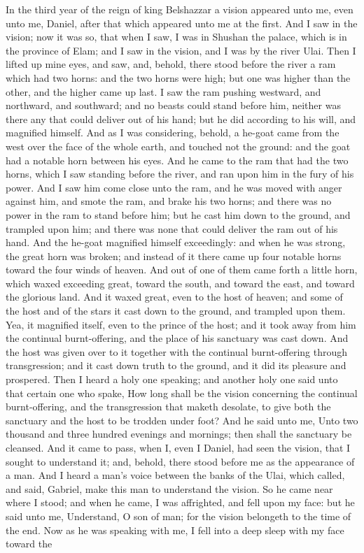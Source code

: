 In the third year of the reign of king Belshazzar a vision appeared unto me, even unto me, Daniel, after that which appeared unto me at the first. And I saw in the vision; now it was so, that when I saw, I was in Shushan the palace, which is in the province of Elam; and I saw in the vision, and I was by the river Ulai. Then I lifted up mine eyes, and saw, and, behold, there stood before the river a ram which had two horns: and the two horns were high; but one was higher than the other, and the higher came up last. I saw the ram pushing westward, and northward, and southward; and no beasts could stand before him, neither was there any that could deliver out of his hand; but he did according to his will, and magnified himself.  And as I was considering, behold, a he-goat came from the west over the face of the whole earth, and touched not the ground: and the goat had a notable horn between his eyes. And he came to the ram that had the two horns, which I saw standing before the river, and ran upon him in the fury of his power. And I saw him come close unto the ram, and he was moved with anger against him, and smote the ram, and brake his two horns; and there was no power in the ram to stand before him; but he cast him down to the ground, and trampled upon him; and there was none that could deliver the ram out of his hand. And the he-goat magnified himself exceedingly: and when he was strong, the great horn was broken; and instead of it there came up four notable horns toward the four winds of heaven.  And out of one of them came forth a little horn, which waxed exceeding great, toward the south, and toward the east, and toward the glorious land. And it waxed great, even to the host of heaven; and some of the host and of the stars it cast down to the ground, and trampled upon them. Yea, it magnified itself, even to the prince of the host; and it took away from him the continual burnt-offering, and the place of his sanctuary was cast down. And the host was given over to it together with the continual burnt-offering through transgression; and it cast down truth to the ground, and it did its pleasure and prospered. Then I heard a holy one speaking; and another holy one said unto that certain one who spake, How long shall be the vision concerning the continual burnt-offering, and the transgression that maketh desolate, to give both the sanctuary and the host to be trodden under foot? And he said unto me, Unto two thousand and three hundred evenings and mornings; then shall the sanctuary be cleansed.  And it came to pass, when I, even I Daniel, had seen the vision, that I sought to understand it; and, behold, there stood before me as the appearance of a man. And I heard a man’s voice between the banks of the Ulai, which called, and said, Gabriel, make this man to understand the vision. So he came near where I stood; and when he came, I was affrighted, and fell upon my face: but he said unto me, Understand, O son of man; for the vision belongeth to the time of the end. Now as he was speaking with me, I fell into a deep sleep with my face toward the 